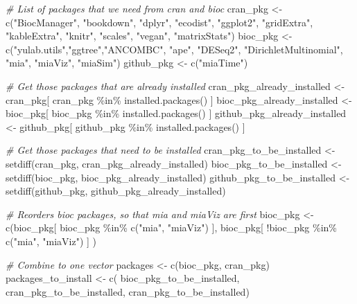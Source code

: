 \documentclass[
  oneside]{book}
\newenvironment{Shaded}{\begin{snugshade}}{\end{snugshade}}
\newcommand{\CommentTok}[1]{\textcolor[rgb]{0.56,0.35,0.01}{\textit{#1}}}
\newcommand{\FunctionTok}[1]{\textcolor[rgb]{0.00,0.00,0.00}{#1}}
\newcommand{\NormalTok}[1]{#1}
\newcommand{\OtherTok}[1]{\textcolor[rgb]{0.56,0.35,0.01}{#1}}
\newcommand{\SpecialCharTok}[1]{\textcolor[rgb]{0.00,0.00,0.00}{#1}}
\newcommand{\StringTok}[1]{\textcolor[rgb]{0.31,0.60,0.02}{#1}}
\begin{document}
\begin{Shaded}
\begin{Highlighting}[]
\CommentTok{\# List of packages that we need from cran and bioc }
\NormalTok{cran\_pkg }\OtherTok{\textless{}{-}} \FunctionTok{c}\NormalTok{(}\StringTok{"BiocManager"}\NormalTok{, }\StringTok{"bookdown"}\NormalTok{, }\StringTok{"dplyr"}\NormalTok{, }\StringTok{"ecodist"}\NormalTok{, }\StringTok{"ggplot2"}\NormalTok{, }
              \StringTok{"gridExtra"}\NormalTok{, }\StringTok{"kableExtra"}\NormalTok{,  }\StringTok{"knitr"}\NormalTok{, }\StringTok{"scales"}\NormalTok{, }\StringTok{"vegan"}\NormalTok{, }\StringTok{"matrixStats"}\NormalTok{)}
\NormalTok{bioc\_pkg }\OtherTok{\textless{}{-}} \FunctionTok{c}\NormalTok{(}\StringTok{"yulab.utils"}\NormalTok{,}\StringTok{"ggtree"}\NormalTok{,}\StringTok{"ANCOMBC"}\NormalTok{, }\StringTok{"ape"}\NormalTok{, }\StringTok{"DESeq2"}\NormalTok{, }\StringTok{"DirichletMultinomial"}\NormalTok{, }\StringTok{"mia"}\NormalTok{, }\StringTok{"miaViz"}\NormalTok{, }\StringTok{"miaSim"}\NormalTok{)}
\NormalTok{github\_pkg }\OtherTok{\textless{}{-}} \FunctionTok{c}\NormalTok{(}\StringTok{"miaTime"}\NormalTok{)}


\CommentTok{\# Get those packages that are already installed}
\NormalTok{cran\_pkg\_already\_installed }\OtherTok{\textless{}{-}}\NormalTok{ cran\_pkg[ cran\_pkg }\SpecialCharTok{\%in\%} \FunctionTok{installed.packages}\NormalTok{() ]}
\NormalTok{bioc\_pkg\_already\_installed }\OtherTok{\textless{}{-}}\NormalTok{ bioc\_pkg[ bioc\_pkg }\SpecialCharTok{\%in\%} \FunctionTok{installed.packages}\NormalTok{() ]}
\NormalTok{github\_pkg\_already\_installed }\OtherTok{\textless{}{-}}\NormalTok{ github\_pkg[ github\_pkg }\SpecialCharTok{\%in\%} \FunctionTok{installed.packages}\NormalTok{() ]}

\CommentTok{\# Get those packages that need to be installed}
\NormalTok{cran\_pkg\_to\_be\_installed }\OtherTok{\textless{}{-}} \FunctionTok{setdiff}\NormalTok{(cran\_pkg, cran\_pkg\_already\_installed)}
\NormalTok{bioc\_pkg\_to\_be\_installed }\OtherTok{\textless{}{-}} \FunctionTok{setdiff}\NormalTok{(bioc\_pkg, bioc\_pkg\_already\_installed)}
\NormalTok{github\_pkg\_to\_be\_installed }\OtherTok{\textless{}{-}} \FunctionTok{setdiff}\NormalTok{(github\_pkg, github\_pkg\_already\_installed)}

\CommentTok{\# Reorders bioc packages, so that mia and miaViz are first}
\NormalTok{bioc\_pkg }\OtherTok{\textless{}{-}} \FunctionTok{c}\NormalTok{(bioc\_pkg[ bioc\_pkg }\SpecialCharTok{\%in\%} \FunctionTok{c}\NormalTok{(}\StringTok{"mia"}\NormalTok{, }\StringTok{"miaViz"}\NormalTok{) ], }
\NormalTok{              bioc\_pkg[ }\SpecialCharTok{!}\NormalTok{bioc\_pkg }\SpecialCharTok{\%in\%} \FunctionTok{c}\NormalTok{(}\StringTok{"mia"}\NormalTok{, }\StringTok{"miaViz"}\NormalTok{) ] ) }

\CommentTok{\# Combine to one vector}
\NormalTok{packages }\OtherTok{\textless{}{-}} \FunctionTok{c}\NormalTok{(bioc\_pkg, cran\_pkg)}
\NormalTok{packages\_to\_install }\OtherTok{\textless{}{-}} \FunctionTok{c}\NormalTok{( bioc\_pkg\_to\_be\_installed, cran\_pkg\_to\_be\_installed, cran\_pkg\_to\_be\_installed)}
\end{Highlighting}
\end{Shaded}
\end{document}
